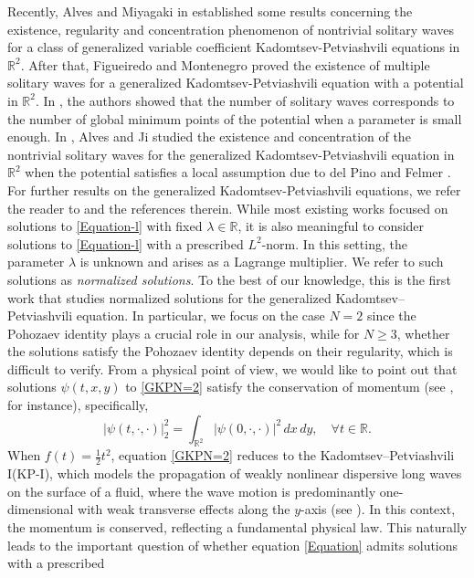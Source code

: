 \documentclass[11pt]{amsart}
\numberwithin{equation}{section}
\begin{document}
{Recently, Alves and Miyagaki in \cite{AM} established some results concerning the existence, regularity and concentration
phenomenon of nontrivial solitary waves for a class of generalized variable
coefficient Kadomtsev-Petviashvili equations in $\mathbb{R}^2$. After that, Figueiredo and Montenegro \cite{FM} proved the existence of multiple solitary waves for a generalized Kadomtsev-Petviashvili equation with a potential in $\mathbb{R}^2$. In \cite{FM}, the authors showed that the number of solitary waves corresponds to the number of global minimum points of the potential when a parameter is small enough. {In \cite{AJ}, Alves and Ji studied the existence and concentration of the nontrivial solitary waves for the generalized Kadomtsev-Petviashvili equation in $\mathbb{R}^2$ when the potential satisfies a local assumption due to  del Pino and Felmer \cite{DF}. For further results on the generalized Kadomtsev-Petviashvili equations,   we refer the reader to }\cite{AMP, AGM, BIN, B, F, GW, HNS, IM, KP1, S, SZ, TG, T, WW, XWD, ZXM} and the references therein.
While most existing works focused on solutions to \eqref{Equation-l} with fixed \( \lambda \in \mathbb{R} \), it is also meaningful to consider solutions to \eqref{Equation-l} with a prescribed \( L^2 \)-norm. In this setting, the parameter \( \lambda \) is unknown and arises as a Lagrange multiplier.
    We refer to such solutions as \emph{normalized solutions}. To the best of our knowledge, this is the first work that studies normalized solutions for the generalized Kadomtsev--Petviashvili equation. In particular, we focus on the case $N=2$ since the Pohozaev identity plays a crucial role in our analysis, while for $N\geq3$, whether the solutions satisfy the Pohozaev identity depends on their regularity, which is difficult to verify.
From a physical point of view, we would like to point out that solutions \( \psi(t,x,y) \) to \eqref{GKPN=2} satisfy the conservation of momentum (see \cite{SYM}, for instance), specifically,
    \[
    |\psi(t,\cdot,\cdot)|_2^2 = \int_{\mathbb{R}^2} |\psi(0,\cdot,\cdot)|^2\, dx\,dy, \quad \forall t \in \mathbb{R}.
    \]
When $f(t) = \frac{1}{2}t^2$, equation \eqref{GKPN=2} reduces to the Kadomtsev--Petviashvili I(KP-I), which models the propagation of weakly nonlinear dispersive long waves on the surface of a fluid, where the wave motion is predominantly one-dimensional with weak transverse effects along the $y$-axis (see \cite{KP1, PetviashviliYankov}).
    In this context, the momentum is conserved, reflecting a fundamental physical law.
This naturally leads to the important question of whether equation \eqref{Equation} admits solutions with a prescribed
}
\end{document}
